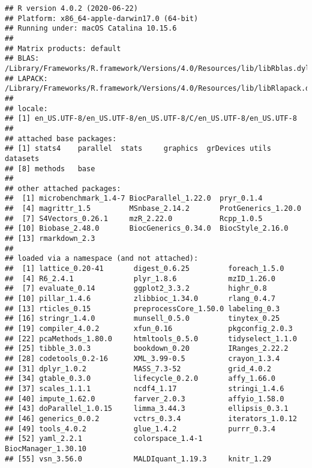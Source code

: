 \documentclass[journal=jacsat,manuscript=suppinfo]{achemso}
\begin{document}
\begin{verbatim}
## R version 4.0.2 (2020-06-22)
## Platform: x86_64-apple-darwin17.0 (64-bit)
## Running under: macOS Catalina 10.15.6
## 
## Matrix products: default
## BLAS:   /Library/Frameworks/R.framework/Versions/4.0/Resources/lib/libRblas.dylib
## LAPACK: /Library/Frameworks/R.framework/Versions/4.0/Resources/lib/libRlapack.dylib
## 
## locale:
## [1] en_US.UTF-8/en_US.UTF-8/en_US.UTF-8/C/en_US.UTF-8/en_US.UTF-8
## 
## attached base packages:
## [1] stats4    parallel  stats     graphics  grDevices utils     datasets 
## [8] methods   base     
## 
## other attached packages:
##  [1] microbenchmark_1.4-7 BiocParallel_1.22.0  pryr_0.1.4          
##  [4] magrittr_1.5         MSnbase_2.14.2       ProtGenerics_1.20.0 
##  [7] S4Vectors_0.26.1     mzR_2.22.0           Rcpp_1.0.5          
## [10] Biobase_2.48.0       BiocGenerics_0.34.0  BiocStyle_2.16.0    
## [13] rmarkdown_2.3       
## 
## loaded via a namespace (and not attached):
##  [1] lattice_0.20-41       digest_0.6.25         foreach_1.5.0        
##  [4] R6_2.4.1              plyr_1.8.6            mzID_1.26.0          
##  [7] evaluate_0.14         ggplot2_3.3.2         highr_0.8            
## [10] pillar_1.4.6          zlibbioc_1.34.0       rlang_0.4.7          
## [13] rticles_0.15          preprocessCore_1.50.0 labeling_0.3         
## [16] stringr_1.4.0         munsell_0.5.0         tinytex_0.25         
## [19] compiler_4.0.2        xfun_0.16             pkgconfig_2.0.3      
## [22] pcaMethods_1.80.0     htmltools_0.5.0       tidyselect_1.1.0     
## [25] tibble_3.0.3          bookdown_0.20         IRanges_2.22.2       
## [28] codetools_0.2-16      XML_3.99-0.5          crayon_1.3.4         
## [31] dplyr_1.0.2           MASS_7.3-52           grid_4.0.2           
## [34] gtable_0.3.0          lifecycle_0.2.0       affy_1.66.0          
## [37] scales_1.1.1          ncdf4_1.17            stringi_1.4.6        
## [40] impute_1.62.0         farver_2.0.3          affyio_1.58.0        
## [43] doParallel_1.0.15     limma_3.44.3          ellipsis_0.3.1       
## [46] generics_0.0.2        vctrs_0.3.4           iterators_1.0.12     
## [49] tools_4.0.2           glue_1.4.2            purrr_0.3.4          
## [52] yaml_2.2.1            colorspace_1.4-1      BiocManager_1.30.10  
## [55] vsn_3.56.0            MALDIquant_1.19.3     knitr_1.29
\end{verbatim}
\end{document}
